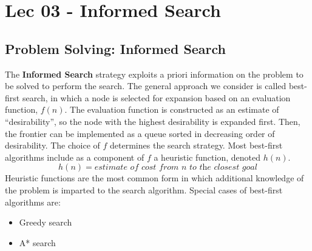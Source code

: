 \chapter{Lec 03 - Informed Search}
\section{Problem Solving: Informed Search}
The \textbf{Informed Search} strategy exploits a priori information on the problem to be solved to perform the search. The general approach we consider is called best-first search,  in which a node is selected for expansion based on an evaluation function, $f(n)$. The evaluation function is constructed as an estimate of “desirability”, so the node with the highest desirability is expanded first. Then, the frontier can be implemented as a queue sorted in decreasing order of desirability.
\newline\newline
The choice of $f$ determines the search strategy. Most best-first algorithms include as a component of $f$ a heuristic function, denoted $h(n)$.
\[h(n) =  \textit{estimate of cost from n to the closest goal}\]
Heuristic functions are the most common form in which additional knowledge of the problem is imparted to the search algorithm.\newline\newline
Special cases of best-first algorithms are:
\begin{itemize}
    \item Greedy search
    \item A* search
\end{itemize}

